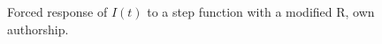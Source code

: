 \documentclass[a4paper,12pt]{article}
\begin{document}
\begin{figure}[H]
\begin{minipage}[b]{0.45\linewidth}
        \caption{Forced response of $I(t)$ to a step function with a modified R, own authorship.}
        \label{fig:scopeistep0}
    \end{minipage}
\end{figure}

\vspace{0.5cm}
\end{document}
